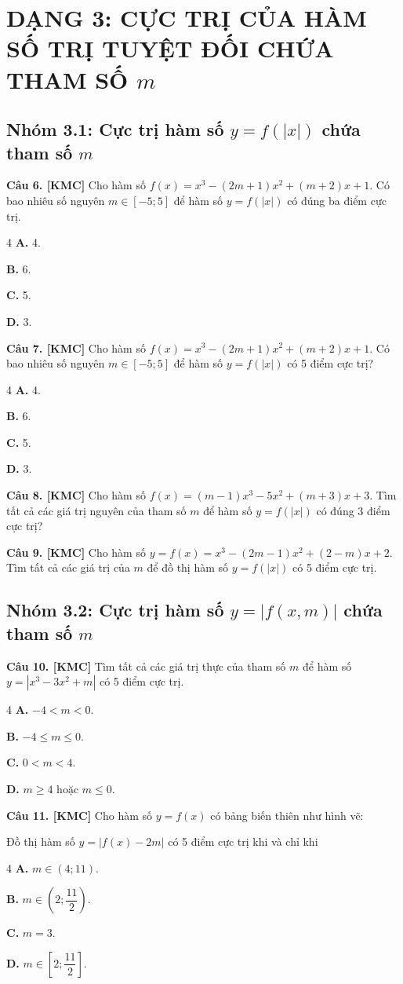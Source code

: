 \documentclass[12pt,a4paper]{article}
\newcommand{\cau}[1]{\noindent\textbf{Câu #1. [KMC]} }
\newcommand{\bonpa}[4]{
    \begin{multicols}{4}
        \noindent\textbf{A.} #1
        \par\noindent\textbf{B.} #2
        \par\noindent\textbf{C.} #3
        \par\noindent\textbf{D.} #4
    \end{multicols}
}
\begin{document}
\section*{DẠNG 3: CỰC TRỊ CỦA HÀM SỐ TRỊ TUYỆT ĐỐI CHỨA THAM SỐ $m$}
\subsection*{Nhóm 3.1: Cực trị hàm số $y = f(|x|)$ chứa tham số $m$}

\cau{6} Cho hàm số $f(x) = x^3 - (2m+1)x^2 + (m+2)x + 1$. Có bao nhiêu số nguyên $m \in [-5;5]$ để hàm số $y = f(|x|)$ có đúng ba điểm cực trị.
\bonpa{4.}{6.}{5.}{3.}

\cau{7} Cho hàm số $f(x) = x^3 - (2m+1)x^2 + (m+2)x + 1$. Có bao nhiêu số nguyên $m \in [-5;5]$ để hàm số $y = f(|x|)$ có 5 điểm cực trị?
\bonpa{4.}{6.}{5.}{3.}

\cau{8} Cho hàm số $f(x) = (m-1)x^3 - 5x^2 + (m+3)x + 3$. Tìm tất cả các giá trị nguyên của tham số $m$ để hàm số $y = f(|x|)$ có đúng 3 điểm cực trị?

\cau{9} Cho hàm số $y = f(x) = x^3 - (2m-1)x^2 + (2-m)x + 2$. Tìm tất cả các giá trị của $m$ để đồ thị hàm số $y = f(|x|)$ có 5 điểm cực trị.

\subsection*{Nhóm 3.2: Cực trị hàm số $y = |f(x,m)|$ chứa tham số $m$}

\cau{10} Tìm tất cả các giá trị thực của tham số $m$ để hàm số $y = |x^3 - 3x^2 + m|$ có 5 điểm cực trị.
\bonpa{$-4 < m < 0$.}{$-4 \le m \le 0$.}{$0 < m < 4$.}{$m \ge 4$ hoặc $m \le 0$.}

\cau{11} Cho hàm số $y = f(x)$ có bảng biến thiên như hình vẽ:
\begin{center}
\end{center}
Đồ thị hàm số $y = |f(x) - 2m|$ có 5 điểm cực trị khi và chỉ khi
\bonpa{$m \in (4;11)$.}{$m \in \left(2; \dfrac{11}{2}\right)$.}{$m = 3$.}{$m \in \left[2; \dfrac{11}{2}\right]$.}
\end{document}
